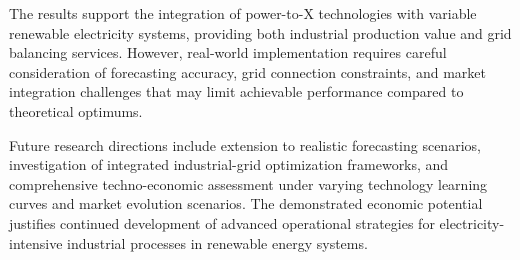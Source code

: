 \documentclass[12pt,a4paper]{article}
\begin{document}
The results support the integration of power-to-X technologies with variable renewable electricity systems, providing both industrial production value and grid balancing services. However, real-world implementation requires careful consideration of forecasting accuracy, grid connection constraints, and market integration challenges that may limit achievable performance compared to theoretical optimums.

Future research directions include extension to realistic forecasting scenarios, investigation of integrated industrial-grid optimization frameworks, and comprehensive techno-economic assessment under varying technology learning curves and market evolution scenarios. The demonstrated economic potential justifies continued development of advanced operational strategies for electricity-intensive industrial processes in renewable energy systems.

\end{document}
